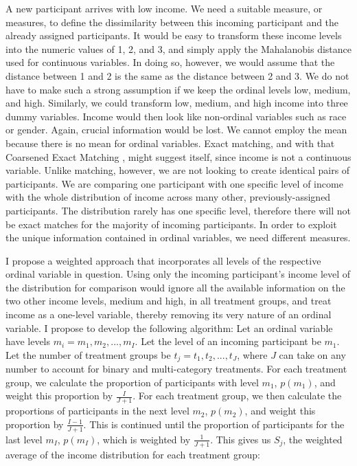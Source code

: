 \documentclass[12pt,]{article}
\begin{document}
A new participant arrives with low income. We need a suitable measure,
or measures, to define the dissimilarity between this incoming
participant and the already assigned participants. It would be easy to
transform these income levels into the numeric values of 1, 2, and 3,
and simply apply the Mahalanobis distance used for continuous variables.
In doing so, however, we would assume that the distance between 1 and 2
is the same as the distance between 2 and 3. We do not have to make such
a strong assumption if we keep the ordinal levels low, medium, and high.
Similarly, we could transform low, medium, and high income into three
dummy variables. Income would then look like non-ordinal variables such
as race or gender. Again, crucial information would be lost. We cannot
employ the mean because there is no mean for ordinal variables. Exact
matching, and with that Coarsened Exact Matching
\citep{iacus_2011_causal}, might suggest itself, since income is not a
continuous variable. Unlike matching, however, we are not looking to
create identical pairs of participants. We are comparing one participant
with one specific level of income with the whole distribution of income
across many other, previously-assigned participants. The distribution
rarely has one specific level, therefore there will not be exact matches
for the majority of incoming participants. In order to exploit the
unique information contained in ordinal variables, we need different
measures.

I propose a weighted approach that incorporates all levels of the
respective ordinal variable in question. Using only the incoming
participant's income level of the distribution for comparison would
ignore all the available information on the two other income levels,
medium and high, in all treatment groups, and treat income as a
one-level variable, thereby removing its very nature of an ordinal
variable. I propose to develop the following algorithm: Let an ordinal
variable have levels \(m_i = m_1, m_2, ..., m_I\). Let the level of an
incoming participant be \(m_1\). Let the number of treatment groups be
\(t_j = t_1, t_2, ..., t_J\), where \(J\) can take on any number to
account for binary and multi-category treatments. For each treatment
group, we calculate the proportion of participants with level \(m_1\),
\(p(m_1)\), and weight this proportion by \(\frac{I}{J+1}\). For each
treatment group, we then calculate the proportions of participants in
the next level \(m_2\), \(p(m_2)\), and weight this proportion by
\(\frac{I-1}{J+1}\). This is continued until the proportion of
participants for the last level \(m_I\), \(p(m_I)\), which is weighted
by \(\frac{1}{J+1}\). This gives us \(S_j\), the weighted average of the
income distribution for each treatment group:
\end{document}
